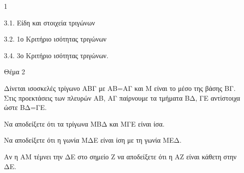 \begin{ylh}{1}
    \item 3.1. Είδη και στοιχεία τριγώνων
    \item 3.2. 1ο Κριτήριο ισότητας τριγώνων
    \item 3.4. 3ο Κριτήριο ισότητας τριγώνων.
\end{ylh}

Θέμα 2

Δίνεται ισοσκελές τρίγωνο ΑΒΓ με ΑΒ=ΑΓ και Μ είναι το μέσο της βάσης ΒΓ. Στις προεκτάσεις των πλευρών ΑΒ, ΑΓ παίρνουμε τα τμήματα ΒΔ, ΓΕ αντίστοιχα ώστε ΒΔ=ΓΕ.

\begin{alist}
\item Να αποδείξετε ότι τα τρίγωνα ΜΒΔ και ΜΓΕ είναι ίσα. 

\item Να αποδείξετε ότι η γωνία ΜΔΕ είναι ίση με τη γωνία ΜΕΔ. 

\item Αν η ΑΜ τέμνει την ΔΕ στο σημείο Ζ να αποδείξετε ότι η ΑΖ είναι κάθετη στην ΔΕ.



\begin{center}
\end{center}
\end{alist}
